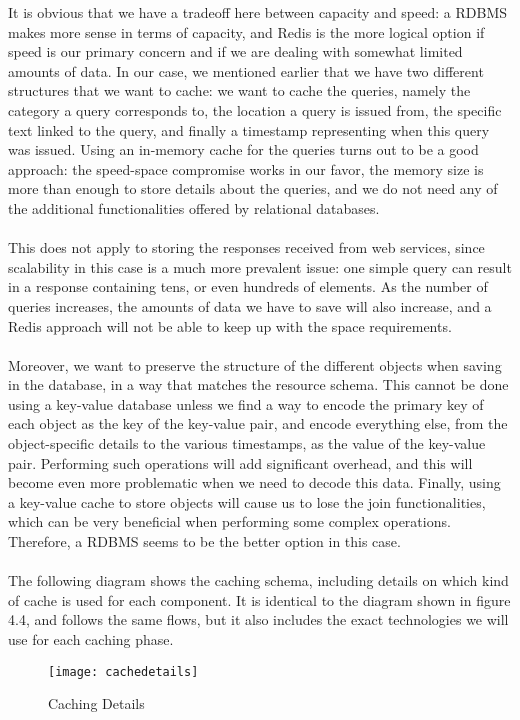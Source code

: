 It is obvious that we have a tradeoff here between capacity and speed: a RDBMS makes more sense in terms of capacity, and Redis is the more logical option if speed is our primary concern and if we are dealing with somewhat limited amounts of data. In our case, we mentioned earlier that we have two different structures that we want to cache: we want to cache the queries, namely the category a query corresponds to, the location a query is issued from, the specific text linked to the query, and finally a timestamp representing when this query was issued. Using an in-memory cache for the queries turns out to be a good approach: the speed-space compromise works in our favor, the memory size is more than enough to store details about the queries, and we do not need any of the additional functionalities offered by relational databases.\\\\
This does not apply to storing the responses received from web services, since scalability in this case is a much more prevalent issue: one simple query can result in a response containing tens, or even hundreds of elements. As the number of queries increases, the amounts of data we have to save will also increase, and a Redis approach will not be able to keep up with the space requirements.\\\\
Moreover, we want to preserve the structure of the different objects when saving in the database, in a way that matches the resource schema. This cannot be done using a key-value database unless we find a way to encode the primary key of each object as the key of the key-value pair, and encode everything else, from the object-specific details to the various timestamps, as the value of the key-value pair. Performing such operations will add significant overhead, and this will become even more problematic when we need to decode this data. Finally, using a key-value cache to store objects will cause us to lose the join functionalities, which can be very beneficial when performing some complex operations. Therefore, a RDBMS seems to be the better option in this case.\\\\
The following diagram shows the caching schema, including details on which kind of cache is used for each component. It is identical to the diagram shown in figure 4.4, and follows the same flows, but it also includes the exact technologies we will use for each caching phase.
\begin{figure}[h]
\centering
\texttt{[image: cachedetails]}
\caption{Caching Details}
\end{figure}
